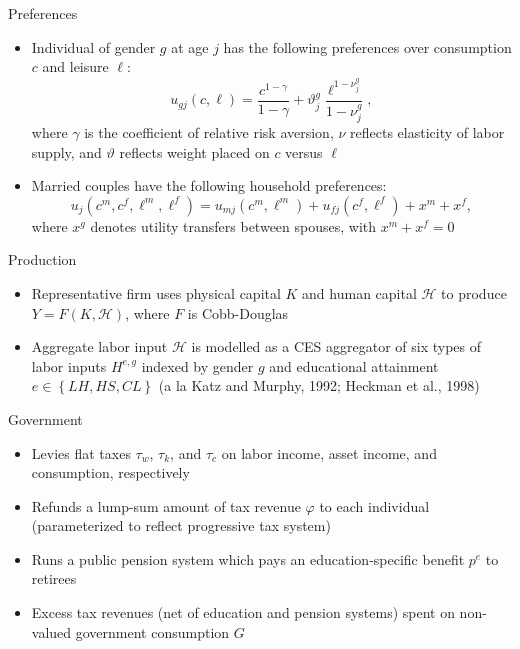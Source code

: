 \documentclass{beamer}
\begin{document}
\begin{frame}{Preferences}
\begin{itemize}
  \item Individual of gender $g$ at age $j$ has the following preferences over consumption $c$ and 				leisure $\ell$:
  		$$u_{gj}(c,\ell) = \frac{c^{1-\gamma}}{1-\gamma} + \vartheta^{g}_{j}\frac{\ell^{1-\nu^{g}_{j}}}			{1-\nu^{g}_{j}},$$
        where $\gamma$ is the coefficient of relative risk aversion, $\nu$ reflects elasticity of labor 		supply, and $\vartheta$ reflects weight placed on $c$ versus $\ell$
  \item Married couples have the following household preferences:
  		$$u_{j}(c^{m},c^{f},\ell^{m},\ell^{f}) = u_{mj}(c^{m},\ell^{m})+u_{fj}(c^{f},							\ell^{f})+x^{m}+x^{f},$$
        where $x^{g}$ denotes utility transfers between spouses, with $x^{m}+x^{f}=0$     
\end{itemize}      
\end{frame}

\begin{frame}{Production}
\begin{itemize}
  \item Representative firm uses physical capital $K$ and human capital $\mathcal{H}$ to produce 				$Y=F(K,\mathcal{H})$, where $F$ is Cobb-Douglas
  \item Aggregate labor input $\mathcal{H}$ is modelled as a CES aggregator of six types of labor 			inputs $H^{e,g}$ indexed by gender $g$ and educational attainment $e\in\left\{LH,HS,CL\right\}$ 		(a la Katz and Murphy, 1992; Heckman et al., 1998)
\end{itemize}      
\end{frame}   

\begin{frame}{Government}
\begin{itemize}
  \item Levies flat taxes $\tau_{w}$, $\tau_{k}$, and $\tau_{c}$ on labor income, asset 						income, and consumption, respectively	
  \item Refunds a lump-sum amount of tax revenue $\varphi$ to each individual (parameterized 		to 			reflect progressive tax system)
  \item Runs a public pension system which pays an education-specific benefit $p^e$ to retirees
  \item Excess tax revenues (net of education and pension systems) spent on non-valued government 				consumption $G$
\end{itemize}      
\end{frame}     
\end{document}
